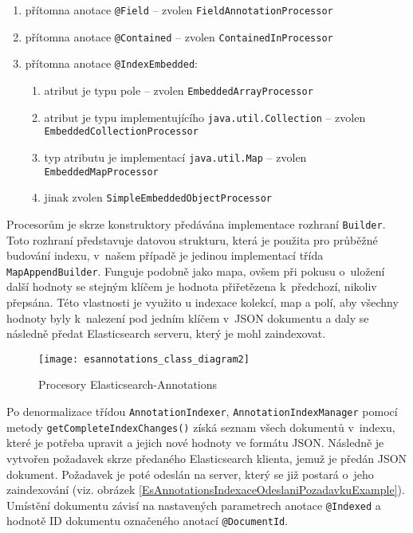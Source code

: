 \documentclass[11pt,oneside]{fithesis2}
\begin{document}
\begin{enumerate}
	\item přítomna anotace \texttt{@Field} -- zvolen \texttt{FieldAnnotationProcessor}
	\item přítomna anotace \texttt{@Contained} -- zvolen \texttt{ContainedInProcessor}
	\item přítomna anotace \texttt{@IndexEmbedded}:
	\begin{enumerate}
		\item atribut je typu pole -- zvolen \texttt{EmbeddedArrayProcessor}  
		\item atribut je typu implementujícího \texttt{java.util.Collection} -- zvolen \texttt{EmbeddedCollectionProcessor}  
		\item typ atributu je implementací \texttt{java.util.Map} -- zvolen \\ \texttt{EmbeddedMapProcessor} 
		\item jinak zvolen \texttt{SimpleEmbeddedObjectProcessor} 
	\end{enumerate}
\end{enumerate}

Procesorům je skrze konstruktory předávána implementace rozhraní \texttt{Builder}. Toto rozhraní představuje datovou strukturu, která je použita pro průběžné budování indexu, v~našem případě je jedinou implementací třída \texttt{MapAppendBuilder}. Funguje podobně jako mapa, ovšem při pokusu o~uložení další hodnoty se stejným klíčem je hodnota přiřetězena k~předchozí, nikoliv přepsána. Této vlastnosti je využito u indexace kolekcí, map a polí, aby všechny hodnoty byly k~nalezení pod jedním klíčem v~JSON dokumentu a daly se následně předat Elasticsearch serveru, který je mohl zaindexovat. 

\begin{figure}[htp]
	\begin{center}
		\texttt{[image: esannotations\_class\_diagram2]}
	\end{center}
	\caption{Procesory Elasticsearch-Annotations}	
	\label{EsAnnotationsIndexaceArchitektura2}
\end{figure}

Po denormalizace třídou \texttt{AnnotationIndexer}, \texttt{AnnotationIndexManager} pomocí metody \texttt{getCompleteIndexChanges()} získá seznam všech dokumentů v~indexu, které je potřeba upravit a jejich nové hodnoty ve formátu JSON. Následně je vytvořen požadavek skrze předaného Elasticsearch klienta, jemuž je předán JSON dokument. Požadavek je poté odeslán na server, který se již postará o~jeho zaindexování (viz. obrázek \ref{EsAnnotationsIndexaceOdeslaniPozadavkuExample}). Umístění dokumentu závisí na nastavených parametrech anotace \texttt{@Indexed} a hodnotě ID dokumentu označeného anotací \texttt{@DocumentId}.
\end{document}
